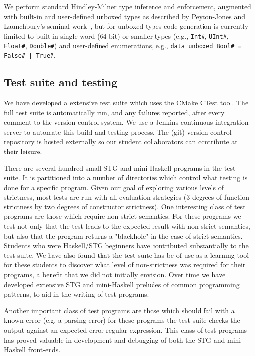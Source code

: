 \documentclass{llncs}
\begin{document}
We perform standard Hindley-Milner type inference and enforcement, augmented
with built-in and user-defined unboxed types as described by Peyton-Jones and
Launchbury's seminal work~\cite{unboxed}, but for unboxed types code
generation is currently limited to built-in single-word (64-bit) or smaller
types (e.g., \texttt{Int\#}, \texttt{UInt\#}, \texttt{Float\#}, \texttt{Double\#})
and user-defined enumerations, e.g., \texttt{data unboxed Bool\# = False\# |
  True\#}.

\subsection{Test suite and testing}

We have developed a extensive test suite which uses the CMake \cite{cmake-book}
CTest tool. The full test suite is automatically run, and any failures reported,
after every comment to the version control system. We use a Jenkins continuous
integration server \cite{jenkins-book} to automate this build and testing process.
The (git) version control repository is hosted externally so our student
collaborators can contribute at their leisure.

There are several hundred small STG and mini-Haskell programs in the test suite.
It is partitioned into a number of directories which control what
testing is done for a specific program. Given our goal of exploring various
levels of strictness, most tests are run with all evaluation strategies (3
degrees of function strictness by two degrees of constructor strictness).
One interesting class of test programs are those which require non-strict
semantics. For these programs we test not only that the test leads to the expected
result with non-strict semantics, but also that the program returns a
"blackhole" in the case of strict semantics. Students who were Haskell/STG
beginners have contributed substantially to the test suite. We have also found
that the test suite has be of use as a learning tool for these students to
discover  what level of non-strictness was required for their programs,
a benefit that we did not initially envision. Over time we have developed
extensive STG and mini-Haskell preludes of common programming patterns, to
aid in the writing of test programs.

Another important class of test programs are those which should fail with a
known error (e.g. a parsing error) for these programs the test suite checks
the output against an expected error regular expression. This class of test
programs has proved valuable in development and debugging of both the STG
and mini-Haskell front-ends.
\end{document}
